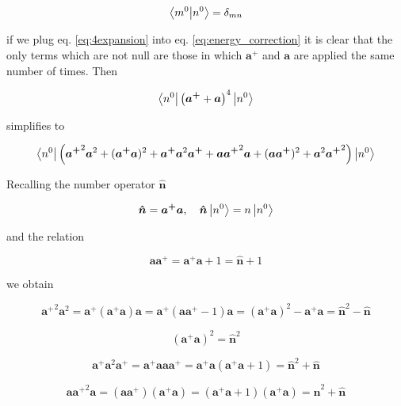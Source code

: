 \documentclass{article}
\begin{document}
\begin{equation}
\braket{m^0}{n^0} = \delta_{mn}
\end{equation}

if we plug eq. \eqref{eq:4expansion} into eq. \eqref{eq:energy_correction} it is clear that the only terms which are not null are those in which \( \bm{a^+} \) and \(\bm{a} \) are applied the same number of times. Then

\begin{equation}
\label{eq:a_sandwich}
\bra{n^0} \left( \bm{a^+} + \bm{a} \right)^4 \ket{n^0}
\end{equation}

simplifies to

\begin{equation}
\label{eq:simplified_a_sandwich}
\bra{n^0} \left( {\bm{a^+}}^2 \bm{a}^2 + (\bm{a^+} \bm{a})^2 + \bm{a^+} \bm{a}^2 \bm{a^+} + \bm{a} {\bm{a^+}}^2 \bm{a} + (\bm{a} \bm{a^+})^2 + \bm{a}^2 {\bm{a^+}}^2 \right) \ket{n^0}
\end{equation}

Recalling the number operator \( \bm{ \hat{n} } \)

\begin{equation}
\bm{ \hat{n} } = \bm{a^+} \bm{a}, \quad \bm{ \hat{n} } \ket{n^0} = n\ket{n^0}
\end{equation}

and the relation

\begin{equation}
\bm{a} \bm{a^+} = \bm{a^+} \bm{a} + 1 = \bm{ \hat{n} } + 1
\end{equation}

we obtain

\begin{equation}
{\bm{a^+}}^2 \bm{a}^2 = \bm{a^+} (\bm{a^+} \bm{a}) \bm{a} = \bm{a^+} ( \bm{a} \bm{a^+} - 1) \bm{a} = (\bm{a^+} \bm{a})^2 - \bm{a^+} \bm{a} = \bm{ \hat{n} }^2 - \bm{ \hat{n} }
\end{equation}

\begin{equation}
(\bm{a^+} \bm{a})^2 = \bm{ \hat{n} }^2
\end{equation}

\begin{equation}
\bm{a^+} \bm{a}^2 \bm{a^+} = \bm{a^+} \bm{a} \bm{a} \bm{a^+} = \bm{a^+} \bm{a} (\bm{a^+} \bm{a} + 1) = \bm{ \hat{n} }^2 + \bm{ \hat{n} }
\end{equation}

\begin{equation}
\bm{a} {\bm{a^+}}^2 \bm{a} = (\bm{a} \bm{a^+})(\bm{a^+} \bm{a}) = (\bm{a^+} \bm{a} + 1) (\bm{a^+} \bm{a}) = \bm{ \hat{n} }^2 + \bm{ \hat{n} }
\end{equation}
\end{document}
